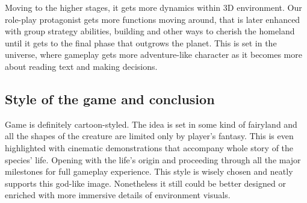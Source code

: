 \documentclass[a4paper,10pt,english]{article}
\begin{document}
Moving to the higher stages, it gets more dynamics within 3D environment. Our role-play protagonist gets more functions moving around, that is later enhanced with group strategy abilities, building and other ways to cherish the homeland until it gets to the final phase that outgrows the planet. This is set in the universe, where gameplay gets more adventure-like character as it becomes more about reading text and making decisions.

\subsection*{Style of the game and conclusion}
Game is definitely cartoon-styled. The idea is set in some kind of fairyland and all the shapes of the creature are limited only by player's fantasy. This is even highlighted with cinematic demonstrations that accompany whole story of the species' life. Opening with the life's origin and proceeding through all the major milestones for full gameplay experience. This style is wisely chosen and neatly supports this god-like image. Nonetheless it still could be better designed or enriched with more immersive details of environment visuals.
\end{document}
